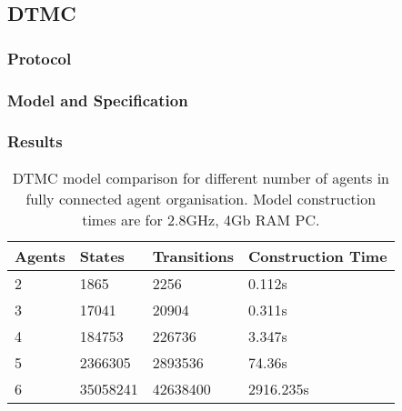 \documentclass{llncs}
\begin{document}
\subsection{DTMC}
\label{subsection:DTMC}
\subsubsection{Protocol}
\subsubsection{Model and Specification}
\subsubsection{Results}


\begin{table}
 \centering
 \begin{tabular}{ | l | l | l | l |}
    \hline
    Agents & States & Transitions & Construction Time \\ \hline
    2 & 1865 & 2256 & 0.112s  \\ \hline
    3 & 17041 & 20904 & 0.311s \\ \hline
    4 & 184753 & 226736 & 3.347s \\ \hline
    5 & 2366305 & 2893536 & 74.36s \\ \hline
    6 & 35058241 & 42638400 & 2916.235s \\ \hline
\end{tabular}
\caption{DTMC model comparison for different number of agents in fully connected agent organisation. Model construction times are for 2.8GHz, 4Gb RAM PC.}
\end{table}
\end{document}
